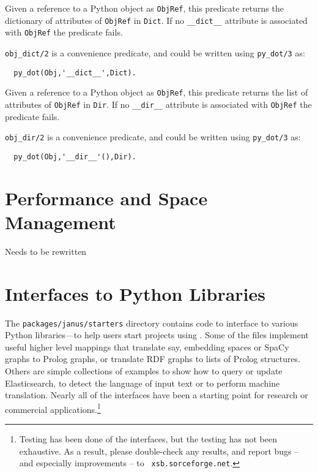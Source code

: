 \begin{description}
%
Given a reference to a Python object as {\tt ObjRef}, this predicate
returns the dictionary of attributes of {\tt ObjRef} in {\tt Dict}.
If no {\tt \_\_dict\_\_} attribute is associated with {\tt ObjRef} the
predicate fails.

{\tt obj\_dict/2} is a convenience predicate, and could be written
using {\tt py\_dot/3} as:

\begin{verbatim}
  py_dot(Obj,'__dict__',Dict).
\end{verbatim}

%
Given a reference to a Python object as {\tt ObjRef}, this predicate
returns the list of attributes of {\tt ObjRef} in {\tt Dir}.  If no
{\tt \_\_dir\_\_} attribute is associated with {\tt ObjRef} the predicate
fails.

{\tt obj\_dir/2} is a convenience predicate, and could be written
using {\tt py\_dot/3} as:

\begin{verbatim}
  py_dot(Obj,'__dir__'(),Dir).
\end{verbatim}

\end{description}

\section{Performance and Space Management} \label{sec:jns-perf}

{\sc Needs to be rewritten}
%

\section{Interfaces to Python Libraries}

The {\tt packages/janus/starters} directory contains code to interface
to various Python libraries---to help users start projects using
\janus{}.  Some of the files implement useful higher level mappings
that translate say, embedding spaces or SpaCy graphs to Prolog graphs,
or translate RDF graphs to lists of Prolog structures.  Others are
simple collections of examples to show how to query or update
Elasticsearch, to detect the language of input text or to perform
machine translation.  Nearly all of the interfaces have been a
starting point for research or commercial
applications.\footnote{Testing has been done of the interfaces, but
the testing has not been exhaustive.  As a result, please double-check
any results, and report bugs -- and especially improvements -- to {\tt
  xsb.sorceforge.net}.}

